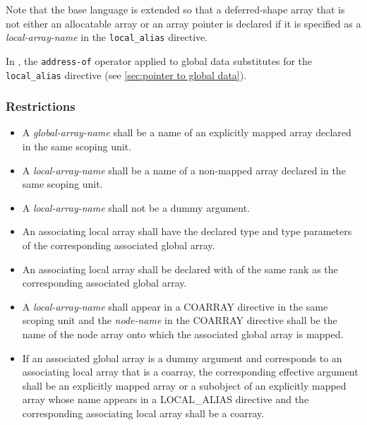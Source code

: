 Note that the base language {\Fort} is extended so that a deferred-shape
array that is not either an allocatable array or an array pointer is
declared if it is specified as a 
{\it local-array-name} in the {\tt local\_alias} directive.

In {\XMPC}, the {\tt address-of} operator applied to global data
substitutes for the {\tt local\_alias} directive (see \ref{sec:pointer
to global data}).


\subsubsection*{Restrictions}

\begin{itemize}
 \item A {\it global-array-name} shall be a name of an explicitly mapped
       array declared in the same scoping unit. 

 \item A {\it local-array-name} shall be a name of a non-mapped array
       declared in the same scoping unit. 

 \item A {\it local-array-name} shall not be a dummy argument.

 \item An associating local array shall have the declared type and type parameters of
       the corresponding associated global array.

 \item An associating local array shall be declared with
        of the
       same rank as the corresponding associated global array.

 \item A {\it local-array-name} shall appear in a COARRAY directive in the
       same scoping unit and the {\it node-name} in the COARRAY directive
       shall be the name of the node array onto which the
       associated global array is mapped.

 \item 
If an associated global array is a dummy argument and corresponds to
an associating local array that is a coarray, 
the corresponding effective argument shall be
an explicitly mapped array or a subobject of 
an explicitly mapped array whose name appears
in a LOCAL\_ALIAS directive %
and the corresponding associating local array shall be a coarray.


\end{itemize}
